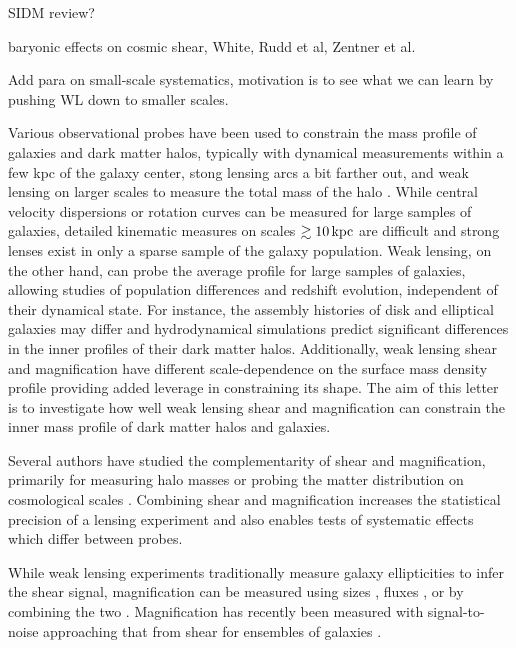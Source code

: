 \documentclass[12pt]{emulateapj}
\begin{document}
SIDM review?

baryonic effects on cosmic shear, White, Rudd et al, Zentner et al.

Add para on small-scale systematics, motivation is to see what we
can learn by pushing WL down to smaller scales.

Various observational probes have been used to constrain the mass
profile of galaxies and dark matter halos, typically with dynamical
measurements within a few kpc of the galaxy center, stong lensing arcs
a bit farther out, and weak lensing on larger scales to measure the
total mass of the halo \citep[e.g.,][]{Sand2004, Koopmans2006,
  Gavazzi2007, Jiang2007, Auger2010, Schulz2010, Newman2013a}.  While
central velocity dispersions or rotation curves can be measured for
large samples of galaxies, detailed kinematic measures on scales
$\gtrsim10\,{\rm kpc}$ are difficult and strong lenses exist in only a sparse
sample of the galaxy population. Weak lensing, on the other hand, can
probe the average profile for large samples of galaxies, allowing
studies of population differences and redshift evolution, independent
of their dynamical state. For instance, the assembly histories of disk
and elliptical galaxies may differ and hydrodynamical simulations
predict significant differences in the inner profiles of their dark
matter halos. Additionally, weak lensing shear and magnification have
different scale-dependence on the surface mass density profile
providing added leverage in constraining its shape. The aim of this
letter is to investigate how well weak lensing shear and magnification
can constrain the inner mass profile of dark matter halos and
galaxies.

Several authors have studied the complementarity of shear and
magnification, primarily for measuring halo masses
\citep{Bartelmann1996, Bridle1998, Schneider2000, vanWaerbeke2010b,
  Rozo2010, Umetsu2011} or probing the matter distribution on
cosmological scales \citep{vanWaerbeke2010a, Casaponsa2013,
  Duncan2013, Krause2013}. Combining shear and magnification increases
the statistical precision of a lensing experiment and also enables
tests of systematic effects which differ between probes.

While weak lensing experiments traditionally measure galaxy
ellipticities to infer the shear signal, magnification can be measured
using sizes \citep{Bartelmann1995}, fluxes \citep{Broadhurst1995}, or
by combining the two \citep{Huff2011, Schmidt2012}. Magnification has
recently been measured with signal-to-noise approaching that from
shear for ensembles of galaxies \citep{Scranton2005, Hildebrandt2009,
  Menard2010, Huff2011, Ford2012, Schmidt2012}.
\end{document}
